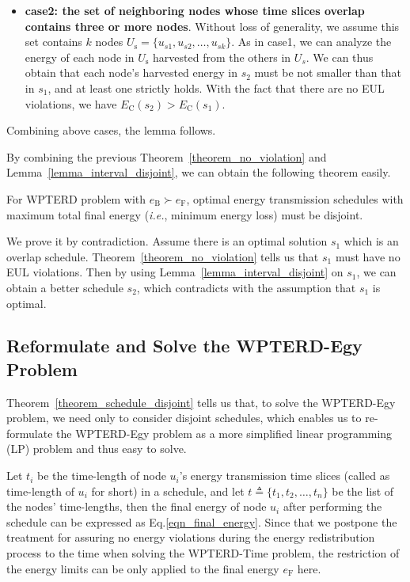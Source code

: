 \documentclass[12pt,journal,onecolumn,draftcls]{IEEEtran}
\begin{document}
\begin{IEEEproof}
\begin{itemize}
\item{\textbf{case2: the set of neighboring nodes whose time slices overlap contains three or more nodes}}.
Without loss of generality, we assume this set contains $k$ nodes $U_\text{s}{=}\{u_{s1},u_{s2},\ldots,u_{sk}\}$. As in case1, we can analyze the energy of each node in $U_\text{s}$ harvested from the others in $U_s$. We can thus obtain that each node's harvested energy in $s_2$ must be not smaller than that in $s_1$, and at least one strictly holds. With the fact that there are no EUL violations, we have $E_\text{C}(s_2){>}E_\text{C}(s_1)$.

\end{itemize}

Combining above cases, the lemma follows.
\end{IEEEproof}

By combining the previous Theorem~\ref{theorem_no_violation} and Lemma~\ref{lemma_interval_disjoint}, we can obtain the following theorem easily.

\begin{theorem}
\label{theorem_schedule_disjoint}
For WPTERD problem with $e_\text{B}{\succ}e_\text{F}$, optimal energy transmission schedules with maximum total final energy (\textit{i.e.}, minimum energy loss) must be disjoint.
\end{theorem}

\begin{IEEEproof}
We prove it by contradiction. Assume there is an optimal solution $s_1$ which is an overlap schedule. Theorem~\ref{theorem_no_violation} tells us that $s_1$ must have no EUL violations. Then by using Lemma~\ref{lemma_interval_disjoint} on $s_1$, we can obtain a better schedule $s_2$, which contradicts with the assumption that $s_1$ is optimal.
\end{IEEEproof}

\subsection{Reformulate and Solve the WPTERD-Egy Problem}

Theorem~\ref{theorem_schedule_disjoint} tells us that, to solve the WPTERD-Egy problem, we need only to consider disjoint schedules, which enables us to re-formulate the WPTERD-Egy problem as a more simplified linear programming (LP) problem and thus easy to solve.

Let $t_i$ be the time-length of node $u_i$'s energy transmission time slices (called as time-length of $u_i$ for short) in a schedule, and let $t{\triangleq}\{t_1,t_2,\ldots,t_n\}$ be the list of the nodes' time-lengths, then the final energy of node $u_i$ after performing the schedule can be expressed as Eq.\eqref{eqn_final_energy}. Since that we postpone the treatment for assuring no energy violations during the energy redistribution process to the time when solving the WPTERD-Time problem, the restriction of the energy limits can be only applied to the final energy $e_\text{F}$ here.
\end{document}
